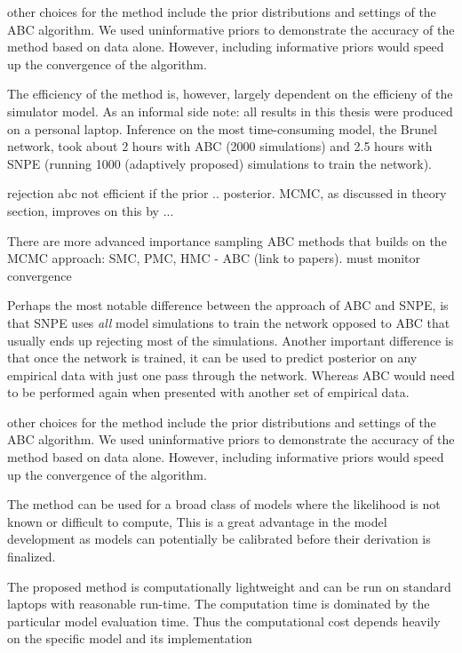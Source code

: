 other choices for the method include the prior distributions and settings of the ABC algorithm. We used uninformative priors to demonstrate the accuracy of the method based on data alone. However, including informative priors would speed up the convergence of the algorithm. 


The efficiency of the method is, however, largely dependent on the efficieny of the simulator model. As an informal side note: all results in this thesis were produced on a personal laptop. Inference on the most time-consuming model, the Brunel network, took about 2 hours with ABC (2000 simulations) and 2.5 hours with SNPE (running 1000 (adaptively proposed) simulations to train the network). 

rejection abc not efficient if the prior .. posterior. MCMC, as discussed in theory section, improves on this by ... 

There are more advanced importance sampling ABC methods that builds on the MCMC approach: SMC, PMC, HMC - ABC (link to papers). must monitor convergence

Perhaps the most notable difference between the approach of ABC and SNPE, is that SNPE uses \textit{all} model simulations to train the network opposed to ABC that usually ends up rejecting most of the simulations. Another important difference is that once the network is trained, it can be used to predict posterior on any empirical data with just one pass through the network. Whereas ABC would need to be performed again when presented with another set of empirical data. 


other choices for the method include the prior distributions and settings of the ABC algorithm. We used uninformative priors to demonstrate the accuracy of the method based on data alone. However, including informative priors would speed up the convergence of the algorithm. 

The method can be used for a broad class of models where the likelihood is not known or difficult to compute, This is a great advantage in the model development as models can potentially be calibrated before their derivation is finalized.

The proposed method is computationally lightweight and can be run on standard laptops with reasonable run-time. The computation time is dominated by the particular model evaluation time. Thus the computational cost depends heavily on the specific model and its implementation

